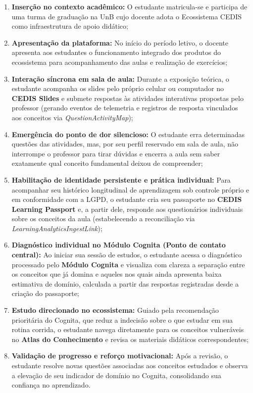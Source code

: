 \begin{enumerate}
    \item \textbf{Inserção no contexto acadêmico:} O estudante matricula-se e participa de uma turma de graduação na UnB cujo docente adota o Ecossistema CEDIS como infraestrutura de apoio didático;
    \item \textbf{Apresentação da plataforma:} No início do período letivo, o docente apresenta aos estudantes o funcionamento integrado dos produtos do ecossistema para acompanhamento das aulas e realização de exercícios;
    \item \textbf{Interação síncrona em sala de aula:} Durante a exposição teórica, o estudante acompanha os slides pelo próprio celular ou computador no \textbf{CEDIS Slides} e submete respostas às atividades interativas propostas pelo professor (gerando eventos de telemetria e registros de resposta vinculados aos conceitos via \textit{QuestionActivityMap});
    \item \textbf{Emergência do ponto de dor silencioso:} O estudante erra determinadas questões das atividades, mas, por seu perfil reservado em sala de aula, não interrompe o professor para tirar dúvidas e encerra a aula sem saber exatamente qual conceito fundamental deixou de compreender;
    \item \textbf{Habilitação de identidade persistente e prática individual:} Para acompanhar seu histórico longitudinal de aprendizagem sob controle próprio e em conformidade com a LGPD, o estudante cria seu passaporte no \textbf{CEDIS Learning Passport} e, a partir dele, responde aos questionários individuais sobre os conceitos da aula (estabelecendo a reconciliação via \textit{LearningAnalyticsIngestLink});
    \item \textbf{Diagnóstico individual no Módulo Cognita (Ponto de contato central):} Ao iniciar sua sessão de estudos, o estudante acessa o diagnóstico processado pelo \textbf{Módulo Cognita} e visualiza com clareza a separação entre os conceitos que já domina e aqueles nos quais ainda apresenta baixa estimativa de domínio, calculada a partir das respostas registradas desde a criação do passaporte;
    \item \textbf{Estudo direcionado no ecossistema:} Guiado pela recomendação prioritária do Cognita, que reduz a indecisão sobre o que estudar em sua rotina corrida, o estudante navega diretamente para os conceitos vulneráveis no \textbf{Atlas do Conhecimento} e revisa os materiais didáticos correspondentes;
    \item \textbf{Validação de progresso e reforço motivacional:} Após a revisão, o estudante resolve novas questões associadas aos conceitos estudados e observa a elevação de seu indicador de domínio no Cognita, consolidando sua confiança no aprendizado.
\end{enumerate}

